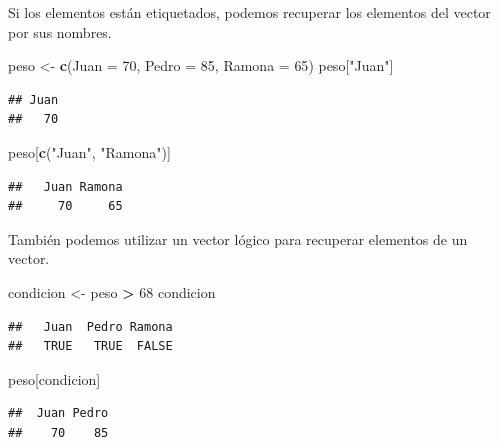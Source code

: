 \documentclass[spanish,]{book}
\newenvironment{Shaded}{\begin{snugshade}}{\end{snugshade}}
\newcommand{\KeywordTok}[1]{\textcolor[rgb]{0.13,0.29,0.53}{\textbf{#1}}}
\newcommand{\DataTypeTok}[1]{\textcolor[rgb]{0.13,0.29,0.53}{#1}}
\newcommand{\DecValTok}[1]{\textcolor[rgb]{0.00,0.00,0.81}{#1}}
\newcommand{\StringTok}[1]{\textcolor[rgb]{0.31,0.60,0.02}{#1}}
\newcommand{\OperatorTok}[1]{\textcolor[rgb]{0.81,0.36,0.00}{\textbf{#1}}}
\newcommand{\NormalTok}[1]{#1}
\begin{document}
Si los elementos están etiquetados, podemos recuperar los elementos del
vector por sus nombres.

\begin{Shaded}
\begin{Highlighting}[]
\NormalTok{peso <-}\StringTok{ }\KeywordTok{c}\NormalTok{(}\DataTypeTok{Juan =} \DecValTok{70}\NormalTok{, }\DataTypeTok{Pedro =} \DecValTok{85}\NormalTok{, }\DataTypeTok{Ramona =} \DecValTok{65}\NormalTok{)}
\NormalTok{peso[}\StringTok{"Juan"}\NormalTok{]}
\end{Highlighting}
\end{Shaded}

\begin{verbatim}
## Juan 
##   70
\end{verbatim}

\begin{Shaded}
\begin{Highlighting}[]
\NormalTok{peso[}\KeywordTok{c}\NormalTok{(}\StringTok{"Juan"}\NormalTok{, }\StringTok{"Ramona"}\NormalTok{)]}
\end{Highlighting}
\end{Shaded}

\begin{verbatim}
##   Juan Ramona 
##     70     65
\end{verbatim}

También podemos utilizar un vector lógico para recuperar elementos de un
vector.

\begin{Shaded}
\begin{Highlighting}[]
\NormalTok{condicion <-}\StringTok{ }\NormalTok{peso }\OperatorTok{>}\StringTok{ }\DecValTok{68}
\NormalTok{condicion}
\end{Highlighting}
\end{Shaded}

\begin{verbatim}
##   Juan  Pedro Ramona 
##   TRUE   TRUE  FALSE
\end{verbatim}

\begin{Shaded}
\begin{Highlighting}[]
\NormalTok{peso[condicion]}
\end{Highlighting}
\end{Shaded}

\begin{verbatim}
##  Juan Pedro 
##    70    85
\end{verbatim}
\end{document}
